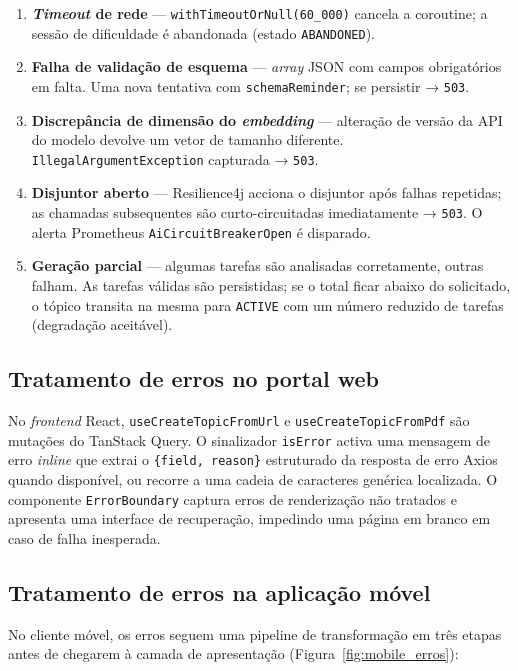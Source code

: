 \begin{enumerate}
  \item \textbf{\textit{Timeout} de rede} — \texttt{withTimeoutOrNull(60\_000)}
    cancela a coroutine; a sessão de dificuldade é abandonada (estado
    \texttt{ABANDONED}).
  \item \textbf{Falha de validação de esquema} — \textit{array} JSON com
    campos obrigatórios em falta. Uma nova tentativa com
    \texttt{schemaReminder}; se persistir → \texttt{503}.
  \item \textbf{Discrepância de dimensão do \textit{embedding}} — alteração
    de versão da API do modelo devolve um vetor de tamanho diferente.
    \texttt{IllegalArgumentException} capturada → \texttt{503}.
  \item \textbf{Disjuntor aberto} — Resilience4j acciona o disjuntor após
    falhas repetidas; as chamadas subsequentes são curto-circuitadas
    imediatamente → \texttt{503}.
    O alerta Prometheus \texttt{AiCircuitBreakerOpen} é disparado.
  \item \textbf{Geração parcial} — algumas tarefas são analisadas
    corretamente, outras falham. As tarefas válidas são persistidas; se o
    total ficar abaixo do solicitado, o tópico transita na mesma para
    \texttt{ACTIVE} com um número reduzido de tarefas (degradação
    aceitável).
\end{enumerate}

\subsection*{Tratamento de erros no portal web}

No \textit{frontend} React, \texttt{useCreateTopicFromUrl} e
\texttt{useCreateTopicFromPdf} são mutações do TanStack Query.
O sinalizador \texttt{isError} activa uma mensagem de erro \textit{inline}
que extrai o \texttt{\{field, reason\}} estruturado da resposta de erro
Axios quando disponível, ou recorre a uma cadeia de caracteres genérica
localizada.
O componente \texttt{ErrorBoundary} captura erros de renderização não
tratados e apresenta uma interface de recuperação, impedindo uma página em
branco em caso de falha inesperada.

\subsection*{Tratamento de erros na aplicação móvel}

No cliente móvel, os erros seguem uma pipeline de transformação em três
etapas antes de chegarem à camada de apresentação
(Figura~\ref{fig:mobile_erros}):

